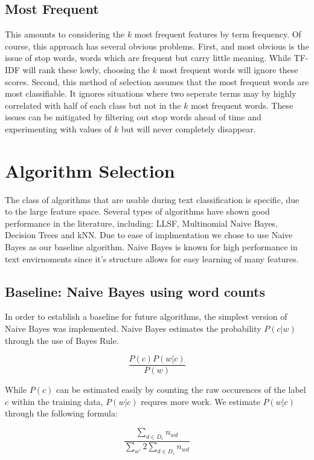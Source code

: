 \documentclass[10pt,twocolumn]{article}
\begin{document}
\subsection*{Most Frequent}

This amounts to considering the $k$ most frequent features by term frequency. Of course, this approach has several obvious problems. First, and most obvious is the issue of stop words, words which are frequent but carry little meaning. While TF-IDF will rank these lowly, choosing the $k$ most frequent words will ignore these scores. Second, this method of selection assumes that the most frequent words are most classifiable. It ignores situations where two seperate terms may by highly correlated with half of each class but not in the $k$ most frequent words. These issues can be mitigated by filtering out stop words ahead of time and experimenting with values of $k$ but will never completely disappear.

\section*{Algorithm Selection}

The class of algorithms that are usable during text classification is specific, due to the large feature space. Several types of algorithms have shown good performance in the literature, including: LLSF, Multinomial Naive Bayes, Decision Trees and kNN. Due to ease of implmentation we chose to use Naive Bayes as our baseline algorithm. Naive Bayes is known for high performance in text envirnoments since it's structure allows for easy learning of many features.

\subsection*{Baseline: Naive Bayes using word counts}

In order to establish a baseline for future algorithms, the simplest version of Naive Bayes was implemented. Naive Bayes estimates the probability $P(c|w)$ through the use of Bayes Rule.

\[ \frac {P(c)P(w|c)} {P(w)} \]

While $P(c)$ can be estimated easily by counting the raw occurences of the label $c$ within the training data, $P(w|c)$ requres more work. We estimate $P(w|c)$ through the following formula:

\[\frac {\sum_{d \in D_c} n_{wd}} {\sum_{w'} 2\sum_{d\in D_c} n_{wd}} \]
\end{document}
